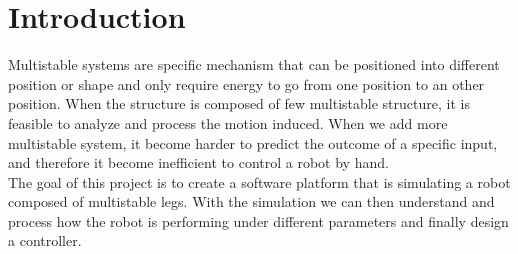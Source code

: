 

\section*{Introduction}
%
\setcounter{page}{1}
    Multistable systems are specific mechanism that can be positioned into different position or shape and only require energy to go from one position to an other position. When the structure is composed of few multistable structure, it is feasible to analyze and process the motion induced. When we add more multistable system, it become harder to predict the outcome of a specific input, and therefore it become inefficient to control a robot by hand. \\
    The goal of this project is to create a software platform that is simulating a robot composed of multistable legs. With the simulation we can then understand and process how the robot is performing under different parameters and finally design a controller.
